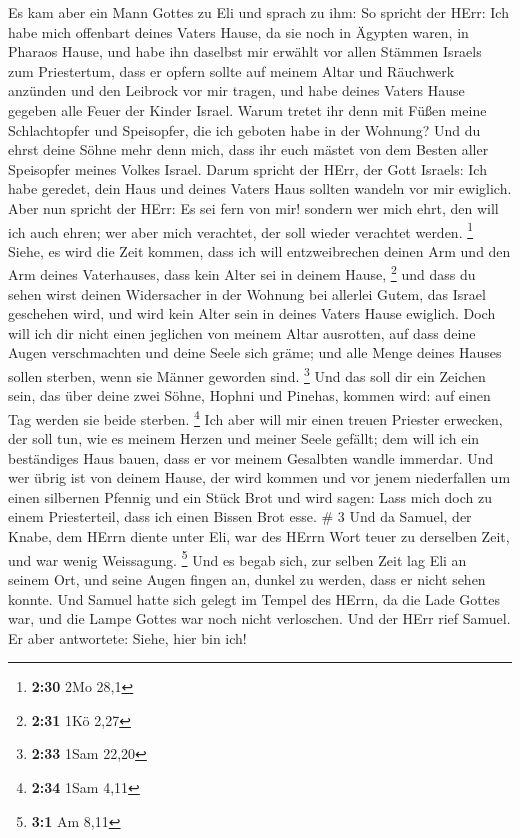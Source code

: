  Es kam aber ein Mann Gottes zu Eli und sprach zu ihm: So
spricht der HErr: Ich habe mich offenbart deines Vaters Hause, da sie
noch in Ägypten waren, in Pharaos Hause,  und habe ihn
daselbst mir erwählt vor allen Stämmen Israels zum Priestertum, dass er
opfern sollte auf meinem Altar und Räuchwerk anzünden und den Leibrock
vor mir tragen, und habe deines Vaters Hause gegeben alle Feuer der
Kinder Israel.  Warum tretet ihr denn mit Füßen meine
Schlachtopfer und Speisopfer, die ich geboten habe in der Wohnung? Und
du ehrst deine Söhne mehr denn mich, dass ihr euch mästet von dem Besten
aller Speisopfer meines Volkes Israel.  Darum spricht der
HErr, der Gott Israels: Ich habe geredet, dein Haus und deines Vaters
Haus sollten wandeln vor mir ewiglich. Aber nun spricht der HErr: Es sei
fern von mir! sondern wer mich ehrt, den will ich auch ehren; wer aber
mich verachtet, der soll wieder verachtet werden. \footnote{\textbf{2:30}
  2Mo 28,1}  Siehe, es wird die Zeit kommen, dass ich will
entzweibrechen deinen Arm und den Arm deines Vaterhauses, dass kein
Alter sei in deinem Hause, \footnote{\textbf{2:31} 1Kö 2,27}
 und dass du sehen wirst deinen Widersacher in der Wohnung
bei allerlei Gutem, das Israel geschehen wird, und wird kein Alter sein
in deines Vaters Hause ewiglich.  Doch will ich dir nicht
einen jeglichen von meinem Altar ausrotten, auf dass deine Augen
verschmachten und deine Seele sich gräme; und alle Menge deines Hauses
sollen sterben, wenn sie Männer geworden sind. \footnote{\textbf{2:33}
  1Sam 22,20}  Und das soll dir ein Zeichen sein, das über
deine zwei Söhne, Hophni und Pinehas, kommen wird: auf einen Tag werden
sie beide sterben. \footnote{\textbf{2:34} 1Sam 4,11}  Ich
aber will mir einen treuen Priester erwecken, der soll tun, wie es
meinem Herzen und meiner Seele gefällt; dem will ich ein beständiges
Haus bauen, dass er vor meinem Gesalbten wandle immerdar. 
Und wer übrig ist von deinem Hause, der wird kommen und vor jenem
niederfallen um einen silbernen Pfennig und ein Stück Brot und wird
sagen: Lass mich doch zu einem Priesterteil, dass ich einen Bissen Brot
esse. \# 3  Und da Samuel, der Knabe, dem HErrn diente unter
Eli, war des HErrn Wort teuer zu derselben Zeit, und war wenig
Weissagung. \footnote{\textbf{3:1} Am 8,11}  Und es begab
sich, zur selben Zeit lag Eli an seinem Ort, und seine Augen fingen an,
dunkel zu werden, dass er nicht sehen konnte.  Und Samuel
hatte sich gelegt im Tempel des HErrn, da die Lade Gottes war, und die
Lampe Gottes war noch nicht verloschen.  Und der HErr rief
Samuel. Er aber antwortete: Siehe, hier bin ich!

